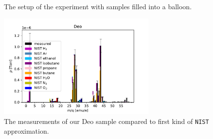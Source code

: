     \begin{figure}[h]
            \centering
            \quad
            \quad
            \caption{The setup of the experiment with samples filled into a balloon.}
            \label{fig:setup2}
    \end{figure}

    
    \begin{figure}[h!]
    \centering
    \includegraphics[width=0.7\textwidth]{Report/DataResultsPlots/deo.pdf}
    \caption{The measurements of our Deo sample compared to first kind of \texttt{NIST} approximation.}
    \label{fig:deo}
    \end{figure}
    
